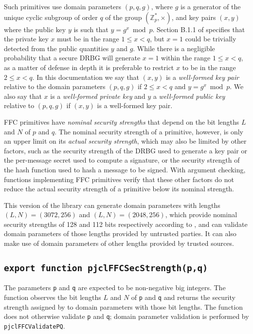 \documentclass[12pt]{article}
\begin{document}
Such primitives
use domain parameters $(p,q,g)$, where $g$ is a generator of the unique
cyclic subgroup of order $q$ of the group $(\mathbb{Z}^*_p,\times)$, and key pairs $(x,y)$ where the public key $y$ 
is such that $y = g^x \bmod p$.
Section B.1.1 of \cite{DSS-4} specifies that the private key $x$ must be in the range
$1 \leq x < q$, but $x=1$ could be trivially detected from the public
quantities $y$ and $g$.  While there is a negligible probability that a
secure DRBG will generate $x=1$ within the range $1 \leq x < q$, as 
a matter of defense in depth it is preferable to restrict $x$ to be in the 
range $2 \leq x < q$.  In this documentation we say that $(x,y)$ is a
{\em well-formed key pair\/} relative to the domain parameters $(p,q,g)$
if $2 \leq x < q$ and $y = g^x \bmod p$.  We also say that $x$ is a {\em well-formed
private key\/} and $y$ a {\em well-formed public key\/} relative to $(p,q,g)$ if $(x,y)$ is 
a well-formed key pair.

FFC primitives have {\em nominal security strengths\/} that depend on the bit lengths $L$
and $N$ of $p$ and $q$. The nominal security strength of a primitive, however, is only
an upper limit on its {\em actual security strength}, which may also be limited by other factors,
such as the security strength of the DRBG used to generate a key pair or the per-message secret
used to compute a signature, or the security strength of the hash function used to hash 
a message to be signed.  With argument checking, functions implementing FFC primitives
verify that these other factors do not reduce the actual security
strength of a primitive below its nominal strength.

This version of the library can generate domain parameters with lengths
$(L,N) = (3072,256)$ and  $(L,N) = (2048,256)$,
which provide nominal security strengths of 128 and 112 bits respectively according to 
\cite[Table~2]{sp800-57part1rev4}, and can validate domain parameters of those lengths
provided by untrusted parties.  It can also make use of domain parameters of other lengths
provided by trusted sources.

\subsection{\tt export function pjclFFCSecStrength(p,q)}

The parameters {\tt p} and {\tt q} are expected to be non-negative big integers.
The function observes the bit lengths $L$ and $N$ of {\tt p} and {\tt q} and returns 
the security strength assigned by \cite[Table~2]{sp800-57part1rev4} to domain
parameters with those bit lengths.  The function does not otherwise validate {\tt p}
and {\tt q}; domain parameter validation is performed by 
{\tt pjclFFCValidatePQ}.
\end{document}
